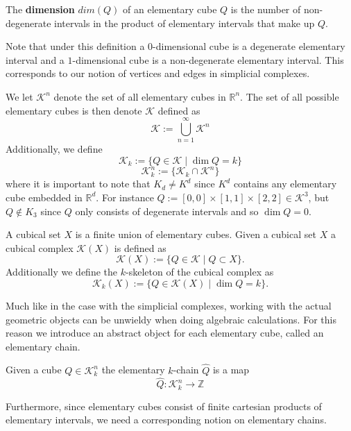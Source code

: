 \begin{example}
\begin{definition}
The \textbf{dimension} $dim(Q)$ of an elementary cube $Q$ is the number of non-degenerate intervals in the product of elementary intervals that make up $Q$.
\end{definition}

Note that under this definition a $0$-dimensional cube is a degenerate elementary interval and a $1$-dimensional cube is a non-degenerate elementary interval. This corresponds to our notion of vertices and edges in simplicial complexes.

We let $\mathcal{K}^{n}$ denote the set of all elementary cubes in $\mathbb{R}^{n}$. The set of all possible elementary cubes is then denote $\mathcal{K}$ defined as
\[ \mathcal{K}:= \bigcup^{\infty}_{n=1} \mathcal{K}^{n} \]
Additionally, we define
\[ \mathcal{K}_{k} := \{ Q \in \mathcal{K} \mid \dim Q = k \}\]
\[ \mathcal{K}^{n}_{k} := \{ \mathcal{K}_{k} \cap \mathcal{K}^{n} \}\]
where it is important to note that $K_{d} \neq K^{d}$ since $K^{d}$ contains any elementary cube embedded in $\mathbb{R}^{d}$. For instance $Q:=[0,0] \times [1,1] \times [2,2] \in \mathcal{K}^{3}$, but $Q \not \in K_{3}$ since $Q$ only consists of degenerate intervals and so $\dim Q = 0$.


\begin{definition}
  A cubical set $X$ is a finite union of elementary cubes. Given a cubical set $X$ a cubical complex $\mathcal{K}(X)$ is defined as
  \[ \mathcal{K}(X):= \{Q \in \mathcal{K} \mid Q \subset X\}.\]
  Additionally we define the $k$-skeleton of the cubical complex as
  \[ \mathcal{K}_{k}(X):= \{ Q \in \mathcal{K}(X) \mid \dim Q = k \}.\]
\end{definition}

Much like in the case with the simplicial complexes, working with the actual geometric objects can be unwieldy when doing algebraic calculations. For this reason we introduce an abstract object for each elementary cube, called an elementary chain.
\begin{definition}
  Given a cube $Q \in \mathcal{K}^{n}_{k}$ the elementary $k$-chain $\hat Q$ is a map
  \[\hat Q: \mathcal{K}^{n}_{k} \to \mathbb{Z}\]
\end{definition}

Furthermore, since elementary cubes consist of finite cartesian products of elementary intervals, we need a corresponding notion on elementary chains.


\end{example}
